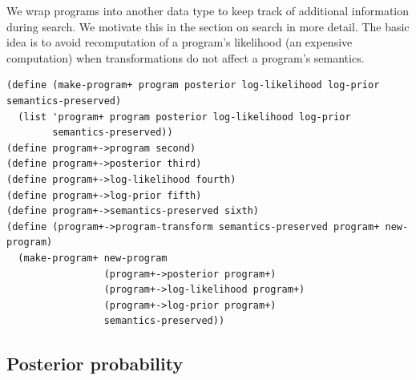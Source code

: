 \documentclass[a4paper,10pt]{article}
\begin{document}
We wrap programs into another data type to keep track of additional information during search. We motivate this in the section on search in more detail. The basic idea is to avoid recomputation of a program's likelihood (an expensive computation) when transformations do not affect a program's semantics.
\begin{lstlisting}[frame=trbl]
(define (make-program+ program posterior log-likelihood log-prior semantics-preserved)
  (list 'program+ program posterior log-likelihood log-prior 
        semantics-preserved))
(define program+->program second)
(define program+->posterior third)
(define program+->log-likelihood fourth)
(define program+->log-prior fifth)
(define program+->semantics-preserved sixth)
(define (program+->program-transform semantics-preserved program+ new-program)
  (make-program+ new-program 
                 (program+->posterior program+) 
                 (program+->log-likelihood program+) 
                 (program+->log-prior program+) 
                 semantics-preserved))
\end{lstlisting}


\subsection{Posterior probability}
\end{document}
